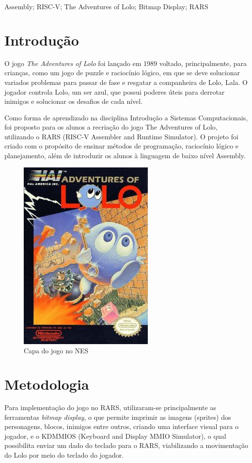 \documentclass[10pt, conference, compsocconf]{IEEEtran}
\begin{document}
\begin{IEEEkeywords}
Assembly; RISC-V; The Adventures of Lolo; Bitmap Display; RARS
\end{IEEEkeywords}


\section{Introdução}
O jogo \textit{The Adventures of Lolo} foi lançado em 1989 voltado, principalmente, para crianças, como um jogo de puzzle e raciocínio lógico, em que se deve solucionar variados problemas para passar de fase e resgatar a companheira de Lolo, Lala. O jogador controla Lolo, um ser azul, que possui poderes úteis para derrotar inimigos e solucionar os desafios de cada nível.

Como forma de aprendizado na disciplina Introdução a Sistemas Computacionais, foi proposto para os alunos a recriação do jogo The Adventures of Lolo, utilizando o RARS (RISC-V Assembler and Runtime Simulator). O projeto foi criado com o propósito de ensinar métodos de programação, raciocínio lógico e planejamento, além de introduzir os alunos à linguagem de baixo nível Assembly.

\begin{figure}[htb]
  \begin{center}
   \includegraphics[width=0.3\linewidth]{./Figures/image_1.png}
  \end{center}
  \caption{Capa do jogo no NES}
  \label{fig:01}
\end{figure}

\section{Metodologia}
\label{sec:Metodologia}

Para implementação do jogo no RARS, utilizaram-se principalmente as ferramentas
\textit{bitmap display}, o que permite imprimir as imagens (sprites) dos personagens,
blocos, inimigos entre outros, criando uma interface visual para o jogador, e o
KDMMIOS (Keyboard and Display MMIO Simulator), o qual possibilita enviar um dado
do teclado para o RARS, viabilizando a movimentação do Lolo por meio do teclado
do jogador.
\end{document}
